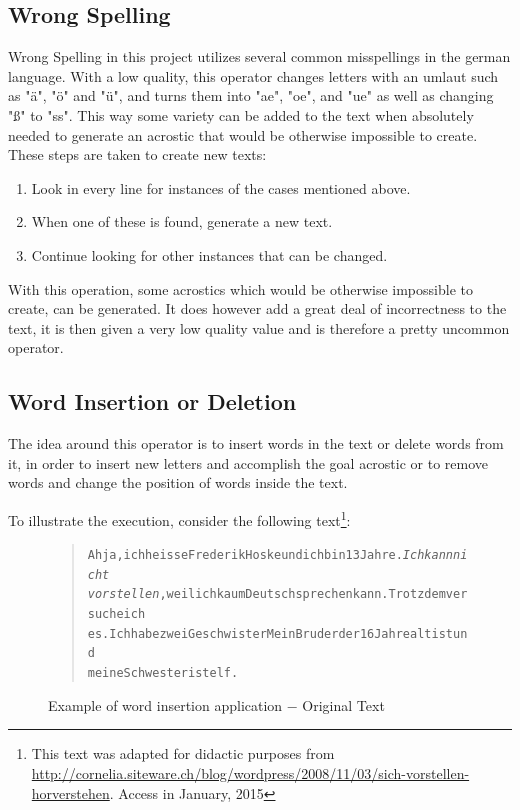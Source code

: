 \documentclass[11pt]{reportAlternative}
\begin{document}
\subsection{Wrong Spelling}
Wrong Spelling in this project utilizes several common misspellings in the german language. With a low quality, this operator changes letters with an umlaut such as "ä", "ö" and "ü", and turns them into "ae", "oe", and "ue" as well as changing "ß" to "ss". This way some variety can be added to the text when absolutely needed to generate an acrostic that would be otherwise impossible to create.
These steps are taken to create new texts:
\begin{enumerate}
\item Look in every line for instances of the cases mentioned above.
\item When one of these is found, generate a new text.
\item Continue looking for other instances that can be changed.
\end{enumerate}
With this operation, some acrostics which would be otherwise impossible to create, can be generated. It does however add a great deal of incorrectness to the text, it is then given a very low quality value and is therefore a pretty uncommon operator.

\subsection{Word Insertion or Deletion}
The idea around this operator is to insert words in the text or delete words from it, in order to insert new letters and accomplish the goal acrostic or to remove words and change the position of words inside the text. \par

To illustrate the execution, consider the following text\footnote{This text was adapted for didactic purposes from \url{http://cornelia.siteware.ch/blog/wordpress/2008/11/03/sich-vorstellen-horverstehen}. Access in January, 2015}:

\begin{figure}[H]
\begin{quote}
\begin{alltt}
Ah ja, ich heisse Frederik Hoske und ich bin 13 Jahre. \textit{Ich kann nicht
vorstellen}, weil ich kaum Deutsch sprechen kann. Trotzdem versuche ich
es. Ich habe zwei Geschwister Mein Bruder der 16 Jahre alt ist und
meine Schwester ist elf.
\end{alltt}
\end{quote}
\caption{Example of word insertion application $-$ Original Text}
\end{figure}
\end{document}
